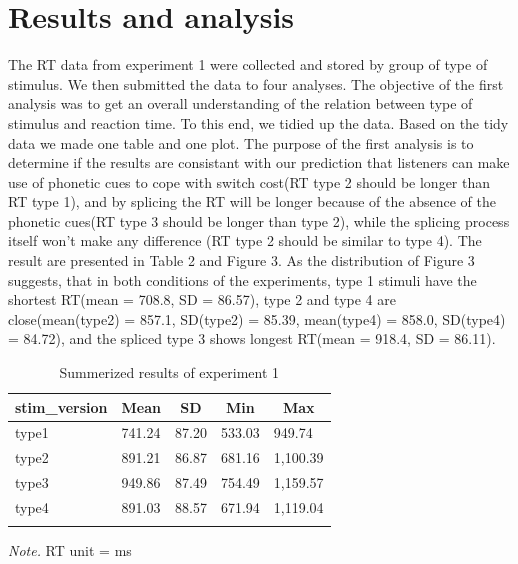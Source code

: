 \documentclass[
  english,
  man,floatsintext]{apa6}
\begin{document}
\hypertarget{results-and-analysis}{%
\section{Results and analysis}\label{results-and-analysis}}

The RT data from experiment 1 were collected and stored by group of type of stimulus. We then submitted the data to four analyses. The objective of the first analysis was to get an overall understanding of the relation between type of stimulus and reaction time. To this end, we tidied up the data. Based on the tidy data we made one table and one plot. The purpose of the first analysis is to determine if the results are consistant with our prediction that listeners can make use of phonetic cues to cope with switch cost(RT type 2 should be longer than RT type 1), and by splicing the RT will be longer because of the absence of the phonetic cues(RT type 3 should be longer than type 2), while the splicing process itself won't make any difference (RT type 2 should be similar to type 4). The result are presented in Table 2 and Figure 3. As the distribution of Figure 3 suggests, that in both conditions of the experiments, type 1 stimuli have the shortest RT(mean = 708.8, SD = 86.57), type 2 and type 4 are close(mean(type2) = 857.1, SD(type2) = 85.39, mean(type4) = 858.0, SD(type4) = 84.72), and the spliced type 3 shows longest RT(mean = 918.4, SD = 86.11).

\begin{table}[tbp]

\begin{center}
\begin{threeparttable}

\caption{\label{tab:table3}Summerized results of experiment 1}

\begin{tabular}{lllll}
\toprule
stim\_version & \multicolumn{1}{c}{Mean} & \multicolumn{1}{c}{SD} & \multicolumn{1}{c}{Min} & \multicolumn{1}{c}{Max}\\
\midrule
type1 & 741.24 & 87.20 & 533.03 & 949.74\\
type2 & 891.21 & 86.87 & 681.16 & 1,100.39\\
type3 & 949.86 & 87.49 & 754.49 & 1,159.57\\
type4 & 891.03 & 88.57 & 671.94 & 1,119.04\\
\bottomrule
\addlinespace
\end{tabular}

\begin{tablenotes}[para]
\normalsize{\textit{Note.} RT unit = ms}
\end{tablenotes}

\end{threeparttable}
\end{center}

\end{table}
\end{document}
